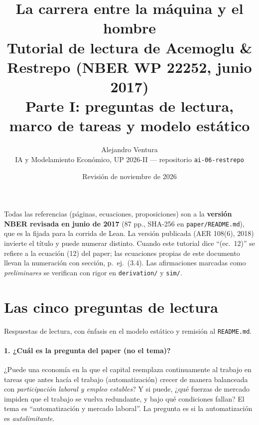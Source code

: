 \documentclass[11pt,a4paper]{article}
\title{\textbf{La carrera entre la máquina y el hombre}\\[2pt]
\large Tutorial de lectura de Acemoglu \& Restrepo (NBER WP 22252, junio 2017)\\[2pt]
\normalsize Parte I: preguntas de lectura, marco de tareas y modelo estático}
\author{Alejandro Ventura \\ \small IA y Modelamiento Económico, UP 2026-II — repositorio \texttt{ai-06-restrepo}}
\date{Revisión de noviembre de 2026}
\theoremstyle{definition}
\theoremstyle{plain}
\theoremstyle{remark}
\numberwithin{equation}{section}
\begin{document}
\maketitle

\begin{nota}
Todas las referencias (páginas, ecuaciones, proposiciones) son a la \textbf{versión NBER revisada en junio de 2017}
(87 pp., SHA-256 en \texttt{paper/README.md}), que es la fijada para la corrida de Lean. La versión publicada
(AER 108(6), 2018) invierte el título y puede numerar distinto. Cuando este tutorial dice ``(ec.~12)'' se refiere a la
ecuación (12) del paper; las ecuaciones propias de este documento llevan la numeración con sección, p.~ej.\ (3.4).
Las afirmaciones marcadas como \emph{preliminares} se verifican con rigor en \texttt{derivation/} y \texttt{sim/}.
\end{nota}

\tableofcontents

\section{Las cinco preguntas de lectura}

Respuestas de lectura, con énfasis en el modelo estático y remisión al \texttt{README.md}.

\paragraph{1. ¿Cuál es la pregunta del paper (no el tema)?}
¿Puede una economía en la que el capital reemplaza continuamente al trabajo en tareas que antes hacía el trabajo
(automatización) crecer de manera balanceada con \emph{participación laboral y empleo estables}? Y si puede,
¿qué fuerzas de mercado impiden que el trabajo se vuelva redundante, y bajo qué condiciones fallan?
El tema es ``automatización y mercado laboral''. La pregunta es si la automatización es \emph{autolimitante}.
\end{document}
